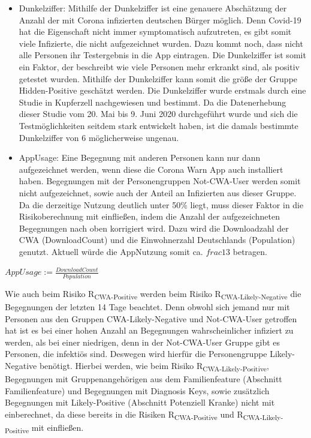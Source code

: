 \documentclass[conference]{IEEEtran}
\begin{document}
\begin{itemize}
	\item Dunkelziffer: Mithilfe der Dunkelziffer ist eine genauere Abschätzung der Anzahl der mit Corona infizierten deutschen Bürger möglich. 
	Denn Covid-19 hat die Eigenschaft nicht immer symptomatisch aufzutreten, es gibt somit viele Infizierte, 
	die nicht aufgezeichnet wurden. Dazu kommt noch, dass nicht alle Personen ihr Testergebnis in die App eintragen.
	Die Dunkelziffer ist somit  ein Faktor, der beschreibt wie viele Personen mehr erkrankt sind, 
	als positiv getestet wurden. Mithilfe der Dunkelziffer kann somit die größe der Gruppe Hidden-Positive geschätzt werden.
	Die Dunkelziffer wurde erstmals durch eine Studie in Kupferzell \cite{Dunkelziffer} nachgewiesen und bestimmt. 
	Da die Datenerhebung dieser Studie vom 20. Mai bis 9. Juni 2020 durchgeführt wurde und sich die Testmöglichkeiten seitdem stark entwickelt haben, 
	ist die damals bestimmte Dunkelziffer von 6 möglicherweise ungenau. 
	\item  AppUsage: Eine Begegnung mit anderen Personen kann nur dann aufgezeichnet werden, wenn diese die Corona Warn App auch installiert haben. 
	Begegnungen mit der Personengruppen Not-CWA-User werden somit nicht aufgezeichnet, sowie auch der Anteil an Infizierten aus dieser Gruppe. 
	Da die derzeitige Nutzung deutlich unter 50\% liegt, muss dieser Faktor in die Risikoberechnung mit einfließen, 
	indem die Anzahl der aufgezeichneten Begegnungen nach oben korrigiert wird. 
	Dazu wird die Downloadzahl der CWA (DownloadCount) und die Einwohnerzahl Deutschlands (Population) genutzt. 
	Aktuell würde die AppNutzung somit ca. $frac{1}{3}$ betragen.\cite{Einwohnerzahl} \cite{Downloads}
\end{itemize}

\centerline{\text{ }}
\centerline{$AppUsage := \frac{DownloadCount}{Population}$}
\centerline{\text{ }}

Wie auch beim Risiko R\textsubscript{CWA-Positive} werden beim Risiko R\textsubscript{CWA-Likely-Negative} die Begegnungen der letzten 14 Tage beachtet.
Denn obwohl sich jemand nur mit Personen aus den Gruppen CWA-Likely-Negative und Not-CWA-User getroffen hat
ist es bei einer hohen Anzahl an Begegnungen wahrscheinlicher infiziert zu werden, als bei einer niedrigen, denn in der Not-CWA-User Gruppe gibt es Personen, die infektiös sind. 
Deswegen wird hierfür die Personengruppe Likely-Negative benötigt. 
Hierbei werden, wie beim Risiko R\textsubscript{CWA-Likely-Positive}, 
Begegnungen mit Gruppenangehörigen aus dem Familienfeature (Abschnitt Familienfeature) und Begegnungen mit Diagnosis Keys, 
sowie zusätzlich Begegnungen mit Likely-Positive (Abschnitt Potenziell Kranke)  nicht mit einberechnet, 
da diese bereits in die Risiken R\textsubscript{CWA-Positive} und R\textsubscript{CWA-Likely-Positive} mit einfließen.
\end{document}
